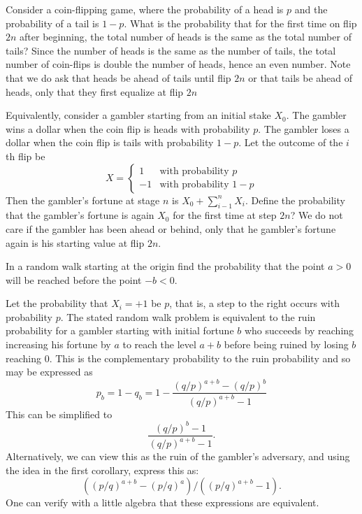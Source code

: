 \begin{problem}
   Consider a coin-flipping game, where the probability of a head is
  $p$ and the probability of a tail is $1-p$.  What is the probability
  that for the first time on flip $2n$ after beginning, the total number of
  heads is the same as the total number of tails?  Since the number of
  heads is the same as the number of tails, the total number of coin-flips
  is double the number of heads, hence an even number.  Note that we
  do ask that heads be ahead of tails until flip $2n$ or that tails be
  ahead of heads, only that they first equalize at flip $2n$

  Equivalently, consider a gambler starting from an initial stake $X_0$.
  The gambler wins a dollar when the coin flip is heads with
  probability $p$.  The gambler loses a dollar when the coin flip is
  tails with probability $1-p$. Let the outcome of the $i$th flip be 
  \[
      X = 
      \begin{cases}
	1  &  \text{with probability $p$} \\
        -1 &  \text{with probability $1-p$}
      \end{cases}
   \]
   Then the gambler's fortune at stage $n$ is $X_0 + \sum_{i-1}^n
   X_i.$ Define the probability that the gambler's fortune is again $X_0$ 
   for the first time at step $2n$?  We do not care if the gambler has been 
   ahead or behind, only that he gambler's fortune again is his starting value 
   at flip $2n$.
\end{problem} 
\begin{solution} 

\end{solution}

\begin{problem}
 In a random walk starting at the origin find the probability
    that the point $a > 0$ will be reached before the point $-b < 0$.
\end{problem} 
\begin{solution} 

Let the probability that $X_i = +1$ be $p$, that is, a step to the
right occurs with probability $p$.
The stated random walk problem is equivalent to the
ruin probability for a gambler starting
with initial fortune $b$ who succeeds by reaching increasing
his fortune by $a$ to reach the level 
$a + b$ before being ruined by losing $b$ reaching 0.  This is the
complementary probability to the ruin probability and so may
be expressed as 
\[
  p_b = 1 - q_b 
      = 1 - \frac{ (q/p)^{a+b} - (q/p)^{b}}{(q/p)^{a+b} - 1}
\]
This can be simplified to 
\[ 
   \frac{ (q/p)^b - 1}{ (q/p)^{a+b} - 1}.
\]
Alternatively, we can view this as the ruin of the gambler's
adversary, and using the idea in the first corollary, express
this as:
\[
( (p/q)^{a+b} - (p/q)^{a} )/( (p/q)^{a+b} - 1 ).
\]
One can verify with a little algebra that these expressions
are equivalent. 
\end{solution}

